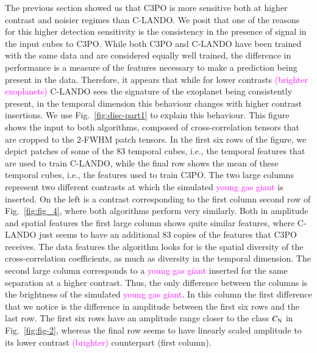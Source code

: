 \documentclass[referee]{aa} %
\newcommand{\newchange}[1]{\textcolor{magenta}{#1}}
\begin{document}
The previous section showed us that C3PO is more sensitive both at higher contrast and noisier regimes than C-LANDO.
We posit that one of the reasons for this higher detection sensitivity is the consistency in the presence of signal in the input cubes to C3PO.
While both C3PO and C-LANDO have been trained with the same data and are considered equally well trained, the difference in performance is a measure of the features necessary to make a prediction being present in the data.
Therefore, it appears that while for lower contrasts \newchange{(brighter exoplanets)} C-LANDO sees the signature of the exoplanet being consistently present, in the temporal dimension this behaviour changes with higher contrast insertions.
We use Fig.~\ref{fig:disc-part1} to explain this behaviour.
This figure shows the input to both algorithms, composed of cross-correlation tensors that are cropped to the 2-FWHM patch tensors.
In the first six rows of the figure, we depict patches of some of the $83$ temporal cubes, i.e., the temporal features that are used to train C-LANDO, while the final row shows the mean of these temporal cubes, i.e., the features used to train C3PO.
The two large columns represent two different contrasts at which the simulated \newchange{young gas giant} is inserted. On the left is a contrast corresponding to the first column second row of Fig.~\ref{fig:fig_4}, where both algorithms perform very similarly.
Both in amplitude and spatial features the first large column shows quite similar features, where C-LANDO just seems to have an additional $83$ copies of the features that C3PO receives. 
The data features the algorithm looks for is the spatial diversity of the cross-correlation coefficients, as much as diversity in the temporal dimension.
The second large column corresponds to a \newchange{young gas giant} inserted for the same separation at a higher contrast.
Thus, the only difference between the columns is the brightness of the simulated \newchange{young gas giant}.
In this column the first difference that we notice is the difference in amplitude between the first six rows and the last row.
The first six rows have an amplitude range closer to the class $C_{\rm N}$ in Fig.~\ref{fig:fig-2}, whereas the final row seems to have linearly scaled amplitude to its lower contrast \newchange{(brighter)} counterpart (first column).
\end{document}
